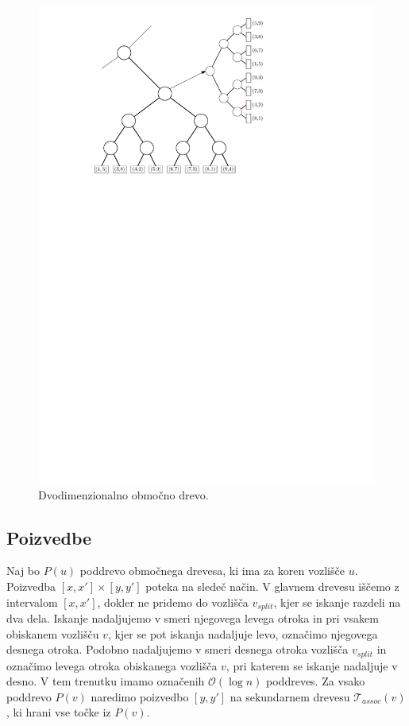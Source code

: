 \documentclass[a4paper, 12pt]{book}
\newcommand{\T}{\ensuremath{\mathcal{T}}}
\newcommand{\OO}{\ensuremath{\mathcal{O}}} %
\begin{document}
\begin{figure}[htp]
\centerline{\includegraphics[scale=1]{pics/rangeTree2.pdf}}
\caption{Dvodimenzionalno območno drevo.}
\label{range-primer}
\end{figure}

\subsection{Poizvedbe}
Naj bo $P(u)$ poddrevo območnega drevesa, ki ima za koren vozlišče $u$. Poizvedba $[x,x'] \times [y,y']$ poteka na sledeč način. V glavnem drevesu iščemo z intervalom $[x,x']$, dokler ne pridemo do vozlišča $v_{split}$, kjer se iskanje razdeli na dva dela. Iskanje nadaljujemo v smeri njegovega levega otroka in pri vsakem obiskanem vozlišču $v$, kjer se pot iskanja nadaljuje levo, označimo njegovega desnega otroka. Podobno nadaljujemo v smeri desnega otroka vozlišča $v_{split}$ in označimo levega otroka obiskanega vozlišča $v$, pri katerem se iskanje nadaljuje v desno. 
V tem trenutku imamo označenih $\OO(\log n)$ poddreves. Za vsako poddrevo $P(v)$ naredimo poizvedbo $[y,y']$ na sekundarnem drevesu $\T_{assoc}(v)$, ki hrani vse točke iz $P(v)$. 
\end{document}
